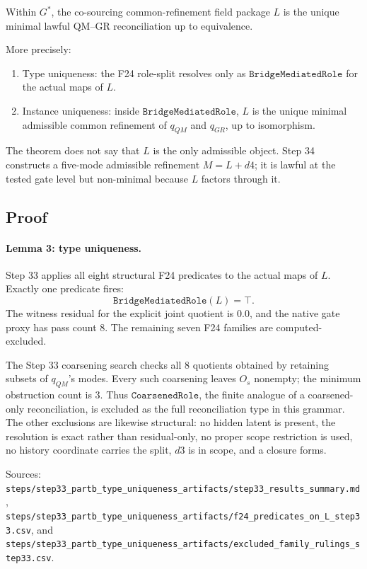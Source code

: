 Within \(G^\ast\), the co-sourcing common-refinement field package \(L\) is
the unique minimal lawful QM--GR reconciliation up to equivalence.

More precisely:
\begin{enumerate}
\item Type uniqueness: the F24 role-split resolves only as
  \(\texttt{BridgeMediatedRole}\) for the actual maps of \(L\).
\item Instance uniqueness: inside \(\texttt{BridgeMediatedRole}\), \(L\) is
  the unique minimal admissible common refinement of \(q_{QM}\) and
  \(q_{GR}\), up to isomorphism.
\end{enumerate}

The theorem does not say that \(L\) is the only admissible object.  Step 34
constructs a five-mode admissible refinement \(M=L+d4\); it is lawful at the
tested gate level but non-minimal because \(L\) factors through it.

\subsection*{Proof}

\paragraph{Lemma 3: type uniqueness.}
Step 33 applies all eight structural F24 predicates to the actual maps of
\(L\).  Exactly one predicate fires:
\[
  \texttt{BridgeMediatedRole}(L)=\top.
\]
The witness residual for the explicit joint quotient is \(0.0\), and the
native gate proxy has pass count \(8\).  The remaining seven F24 families are
computed-excluded.

The Step 33 coarsening search checks all \(8\) quotients obtained by retaining
subsets of \(q_{QM}\)'s modes.  Every such coarsening leaves \(O_s\) nonempty;
the minimum obstruction count is \(3\).  Thus
\(\texttt{CoarsenedRole}\), the finite analogue of a coarsened-only
reconciliation, is excluded as the full reconciliation type in this grammar.
The other exclusions are likewise structural: no hidden latent is present,
the resolution is exact rather than residual-only, no proper scope restriction
is used, no history coordinate carries the split, \(d3\) is in scope, and a
closure forms.

Sources:
\texttt{steps/step33\_partb\_type\_uniqueness\_artifacts/step33\_results\_summary.md},
\texttt{steps/step33\_partb\_type\_uniqueness\_artifacts/f24\_predicates\_on\_L\_step33.csv},
and
\texttt{steps/step33\_partb\_type\_uniqueness\_artifacts/excluded\_family\_rulings\_step33.csv}.

